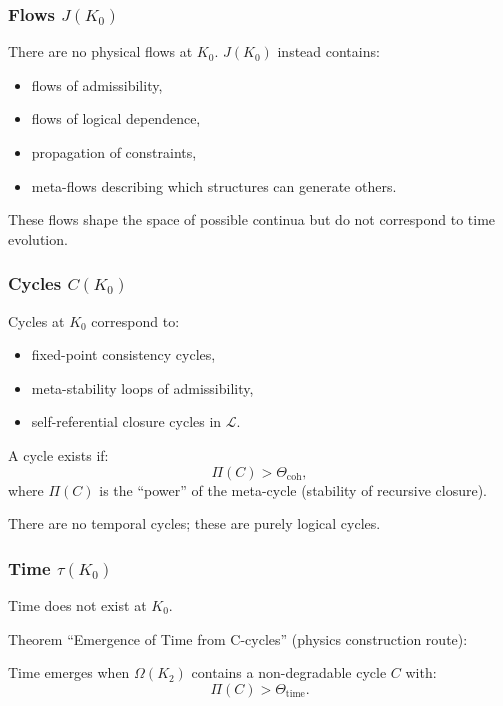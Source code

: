 \subsubsection{Flows \texorpdfstring{$J(K_0)$}{J(K_0)}}

There are no physical flows at $K_0$.  
$J(K_0)$ instead contains:
\begin{itemize}
    \item flows of admissibility,
    \item flows of logical dependence,
    \item propagation of constraints,
    \item meta-flows describing which structures can generate others.
\end{itemize}

These flows shape the space of possible continua but do not correspond
to time evolution.

\subsubsection{Cycles \texorpdfstring{$C(K_0)$}{C(K_0)}}

Cycles at $K_0$ correspond to:
\begin{itemize}
    \item fixed-point consistency cycles,
    \item meta-stability loops of admissibility,
    \item self-referential closure cycles in $\mathcal{L}$.
\end{itemize}

A cycle exists if:
\[
\Pi(C) > \Theta_{\mathrm{coh}},
\]
where $\Pi(C)$ is the ``power'' of the meta-cycle (stability of recursive
closure).

There are no temporal cycles; these are purely logical cycles.

\subsubsection{Time \texorpdfstring{$\tau(K_0)$}{\tau(K_0)}}

Time does not exist at $K_0$.

Theorem “Emergence of Time from C-cycles” (physics construction route):

Time emerges when $\Omega(K_2)$ contains a non-degradable cycle
$C$ with:
\[
\Pi(C) > \Theta_{\mathrm{time}}.
\]

